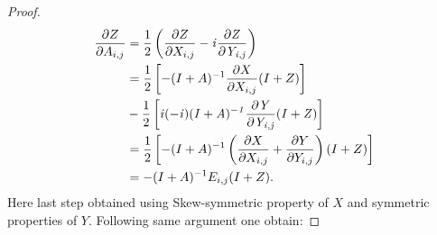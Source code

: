 \documentclass[letterpaper]{article} %
\begin{document}
\begin{proof}
\begin{align*}
\frac{\partial Z}{\partial A_{i,j}} &= \frac{1}{2}\left( \frac{\partial Z}{\partial X_{i,j}} -\it{i} \frac{\partial Z}{\partial Y_{i,j}}\right)\\
&= \frac{1}{2}\left[ -(I+A)^{-1} \frac{\partial X}{\partial X_{i,j}} (I+ Z)\right]\\
&-\frac{1}{2}\left[\it{i}(-\it{i})(I+A)^{-1} \frac{\partial Y}{\partial Y_{i,j}} (I+ Z) \right]\\
&= \frac{1}{2}\left[ -(I+A)^{-1} \left(\frac{\partial X}{\partial X_{i,j}} + \frac{\partial Y}{\partial Y_{i,j}}\right)(I+ Z) \right]\\
&= -(I+A)^{-1} E_{i,j}(I+Z).
\end{align*}
\noindent Here last step obtained using Skew-symmetric property of $X$ and symmetric properties of $Y$. Following same argument one obtain:


\end{proof}
\end{document}
